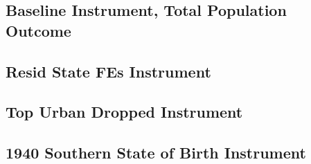 \documentclass{article}
\begin{document}
\subsection{Baseline Instrument, Total Population Outcome}



\clearpage



\clearpage


\clearpage

\subsection{Resid State FEs Instrument}



\clearpage



\clearpage


\clearpage

\subsection{Top Urban Dropped Instrument}



\clearpage



\clearpage


\clearpage


\subsection{1940 Southern State of Birth Instrument}



\clearpage

\end{document}
